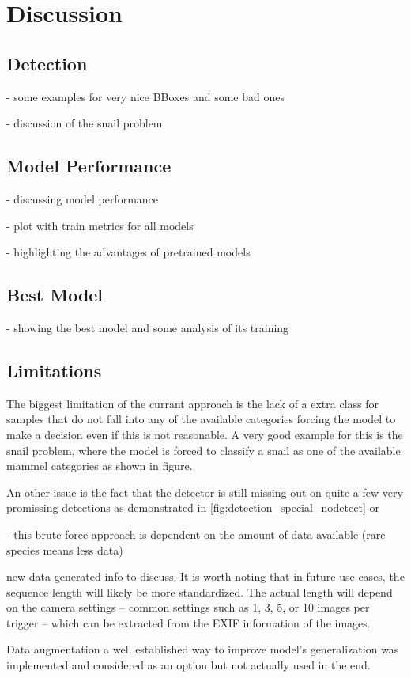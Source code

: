 


\section{Discussion}
\label{discussion}

    \subsection{Detection}
    - some examples for very nice BBoxes and some bad ones

    - discussion of the snail problem

    \subsection{Model Performance}
    - discussing model performance

    - plot with train metrics for all models

    - highlighting the advantages of pretrained models

    \subsection{Best Model}
    - showing the best model and some analysis of its training

    \subsection{Limitations}

    The biggest limitation of the currant approach is the lack of a extra class for samples that do not fall into any of the available categories forcing the model to make a decision even if this is not reasonable.
    A very good example for this is the snail problem, where the model is forced to classify a snail as one of the available mammel categories as shown in figure.
    
    An other issue is the fact that the detector is still missing out on quite a few very promissing detections as demonstrated in \autoref{fig:detection_special_nodetect} or 


    - this brute force approach is dependent on the amount of data available (rare species means less data)


    new data generated info to discuss:
    It is worth noting that in future use cases, the sequence length will likely be more standardized.
    The actual length will depend on the camera settings -- common settings such as 1, 3, 5, or 10 images per trigger -- which can be extracted from the EXIF information of the images.

    Data augmentation a well established way to improve model's generalization \autocite{shortenSurveyImageData2019} was implemented and considered as an option but not actually used in the end.